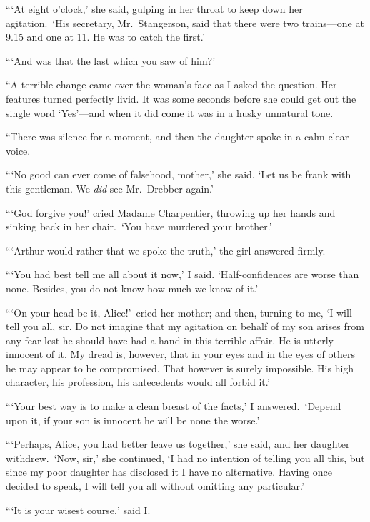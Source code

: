 \documentclass[12pt,english,oneside]{book}
\newcommand{\mdsh}[1]{\mbox{#1}\linebreak[1]}
\begin{document}
{}```At eight o'clock,' she said, gulping in her throat to keep down
her agitation.\  `His secretary, Mr.\ Stangerson, said that there
were two trains\mdsh{---}one at 9.15 and one at 11. He was to catch
the first.'

{}```And was that the last which you saw of him?'

{}``A terrible change came over the woman's face as I asked the question.
Her features turned perfectly livid. It was some seconds before she
could get out the single word `Yes'\mdsh{---}and when it did come
it was in a husky unnatural tone.

{}``There was silence for a moment, and then the daughter spoke in
a calm clear voice.

{}```No good can ever come of falsehood, mother,' she said. `Let
us be frank with this gentleman. We \textit{did} see Mr.\ Drebber
again.'

{}```God forgive you!' cried Madame Charpentier, throwing up her
hands and sinking back in her chair.\  `You have murdered your brother.'

{}```Arthur would rather that we spoke the truth,' the girl answered
firmly.

{}```You had best tell me all about it now,' I said. `Half-confidences
are worse than none. Besides, you do not know how much we know of
it.'

{}```On your head be it, Alice!'\ cried her mother; and then, turning
to me, `I will tell you all, sir. Do not imagine that my agitation
on behalf of my son arises from any fear lest he should have had a
hand in this terrible affair. He is utterly innocent of it. My dread
is, however, that in your eyes and in the eyes of others he may appear
to be compromised. That however is surely impossible. His high character,
his profession, his antecedents would all forbid it.'

{}```Your best way is to make a clean breast of the facts,' I answered.\ 
`Depend upon it, if your son is innocent he will be none the worse.'

{}```Perhaps, Alice, you had better leave us together,' she said,
and her daughter withdrew.\  `Now, sir,' she continued, `I had no
intention of telling you all this, but since my poor daughter has
disclosed it I have no alternative. Having once decided to speak,
I will tell you all without omitting any particular.'

{}```It is your wisest course,' said I.
\end{document}
